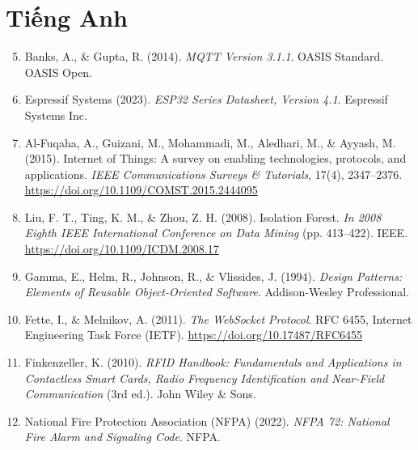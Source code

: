 \section*{Tiếng Anh}
\begin{enumerate}
    \setcounter{enumi}{4}
    \item Banks, A., \& Gupta, R. (2014). \textit{MQTT Version 3.1.1}. OASIS Standard. OASIS Open.
    \item Espressif Systems (2023). \textit{ESP32 Series Datasheet, Version 4.1}. Espressif Systems Inc.
    \item Al-Fuqaha, A., Guizani, M., Mohammadi, M., Aledhari, M., \& Ayyash, M. (2015). Internet of Things: A survey on enabling technologies, protocols, and applications. \textit{IEEE Communications Surveys \& Tutorials}, 17(4), 2347–2376. \url{https://doi.org/10.1109/COMST.2015.2444095}
    \item Liu, F. T., Ting, K. M., \& Zhou, Z. H. (2008). Isolation Forest. \textit{In 2008 Eighth IEEE International Conference on Data Mining} (pp. 413–422). IEEE. \url{https://doi.org/10.1109/ICDM.2008.17}
    \item Gamma, E., Helm, R., Johnson, R., \& Vlissides, J. (1994). \textit{Design Patterns: Elements of Reusable Object-Oriented Software}. Addison-Wesley Professional.
    \item Fette, I., \& Melnikov, A. (2011). \textit{The WebSocket Protocol}. RFC 6455, Internet Engineering Task Force (IETF). \url{https://doi.org/10.17487/RFC6455}
    \item Finkenzeller, K. (2010). \textit{RFID Handbook: Fundamentals and Applications in Contactless Smart Cards, Radio Frequency Identification and Near-Field Communication} (3rd ed.). John Wiley \& Sons.
    \item National Fire Protection Association (NFPA) (2022). \textit{NFPA 72: National Fire Alarm and Signaling Code}. NFPA.
\end{enumerate}
\newpage
